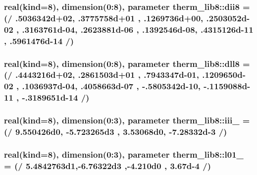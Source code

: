 \subsubsection[{dii8}]{\setlength{\rightskip}{0pt plus 5cm}real(kind=8), dimension(0\+:8), parameter therm\+\_\+lib8\+::dii8 = (/ .\+5036342d+02, .\+3775758d+01 , .\+1269736d+00, .\+2503052d-\/02 , .\+3163761d-\/04, .\+2623881d-\/06 , .\+1392546d-\/08, .\+4315126d-\/11 , .\+5961476d-\/14 /)}\label{namespacetherm__lib8_a3bfe64ca1b1761eb7fddc3aa544df182}
\hypertarget{namespacetherm__lib8_adbebbc1cdfb1af05d0cf1f50b2f0df90}{}
\subsubsection[{dll8}]{\setlength{\rightskip}{0pt plus 5cm}real(kind=8), dimension(0\+:8), parameter therm\+\_\+lib8\+::dll8 = (/ .\+4443216d+02, .\+2861503d+01 , .\+7943347d-\/01, .\+1209650d-\/02 , .\+1036937d-\/04, .\+4058663d-\/07 , -\/.\+5805342d-\/10, -\/.\+1159088d-\/11 , -\/.\+3189651d-\/14 /)}\label{namespacetherm__lib8_adbebbc1cdfb1af05d0cf1f50b2f0df90}
\hypertarget{namespacetherm__lib8_ae4acd61a7c0e6a8e640771554e879769}{}
\subsubsection[{iii\+\_\+78}]{\setlength{\rightskip}{0pt plus 5cm}real(kind=8), dimension(0\+:3), parameter therm\+\_\+lib8\+::iii\+\_ = (/ 9.\+550426d0, -\/5.\+723265d3 , 3.\+53068d0, -\/7.\+28332d-\/3 /)}\label{namespacetherm__lib8_ae4acd61a7c0e6a8e640771554e879769}
\hypertarget{namespacetherm__lib8_a2874cfd6a2661d95f8a2b827ebbd1d5d}{}
\subsubsection[{l01\+\_\+108}]{\setlength{\rightskip}{0pt plus 5cm}real(kind=8), dimension(0\+:3), parameter therm\+\_\+lib8\+::l01\+\_ = (/ 5.\+4842763d1,-\/6.\+76322d3 ,-\/4.\+210d0 , 3.\+67d-\/4 /)}\label{namespacetherm__lib8_a2874cfd6a2661d95f8a2b827ebbd1d5d}
\hypertarget{namespacetherm__lib8_ab6c640a78c761844912d94aac7c317b8}{}
